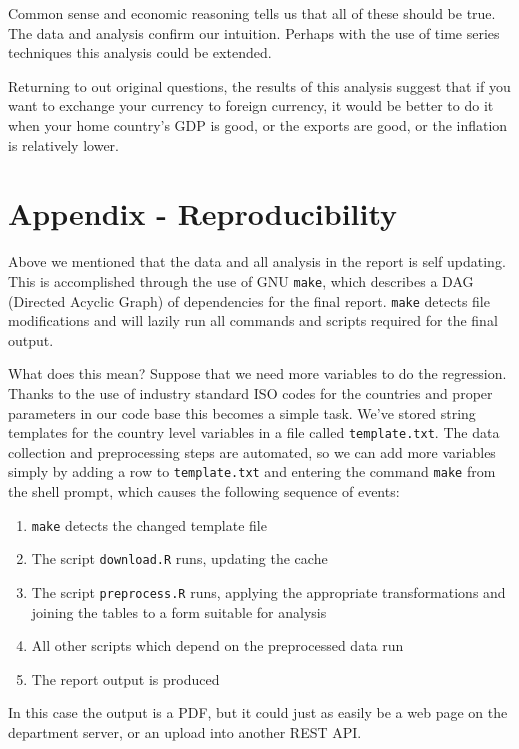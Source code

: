 \documentclass[12pt]{article}
\begin{document}
Common sense and economic reasoning tells us that all of these should be
true. The data and analysis confirm our intuition. Perhaps with the use of
time series techniques this analysis could be extended.

Returning to out original questions, the results of this analysis suggest
that if you want to exchange your currency
to foreign currency, it would be better to do it when your home country's 
GDP is good, or the exports are good, or the inflation is relatively lower.

\newpage

\section{Appendix - Reproducibility}

Above we mentioned that the data and all analysis in the report is self 
updating. This is accomplished through the use of GNU \texttt{make}, which
describes a DAG (Directed Acyclic Graph) of dependencies for the final
report. \texttt{make} detects file modifications and will lazily run all
commands and scripts required for the final output.

What does this mean? Suppose that we need more variables to do the
regression. Thanks to the use
of industry standard ISO codes for the countries and proper parameters in
our code base this becomes a simple task.
We've stored string templates for the country level 
variables in a file
called \texttt{template.txt}. The data collection and preprocessing steps
are automated, so we can add more variables simply by adding a row to
\texttt{template.txt} and entering the command \texttt{make} from the shell
prompt, which causes the following sequence of events: 

\begin{enumerate}
    \item \texttt{make} detects the changed template file
    \item The script \texttt{download.R} runs, updating the cache
    \item The script \texttt{preprocess.R} runs, applying the appropriate
        transformations and joining the tables to a form suitable for
        analysis
    \item All other scripts which depend on the preprocessed data run
    \item The report output is produced
\end{enumerate}

In this case the output is a PDF, but it could just as easily be a web page
on the department server, or an upload into another REST API.
\end{document}
